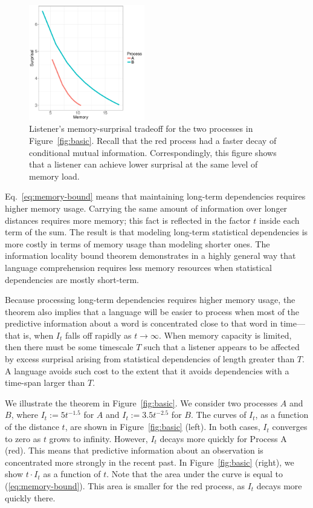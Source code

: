 \begin{figure}
\includegraphics[width=0.45\textwidth]{figures/listener-tradeoff.pdf}
	\caption{Listener's memory-surprisal tradeoff for the two processes in Figure~\ref{fig:basic}. Recall that the red process had a faster decay of conditional mutual information. Correspondingly, this figure shows that a listener can achieve lower surprisal at the same level of memory load.}\label{fig:listener-tradeoff}
\end{figure}

Eq.~\ref{eq:memory-bound} means that maintaining long-term dependencies requires higher memory usage. Carrying the same amount of information over longer distances requires more memory; this fact is reflected in the factor $t$ inside each term of the sum. 
The result is that modeling long-term statistical dependencies is more costly in terms of memory usage than modeling shorter ones.
The information locality bound theorem demonstrates in a highly general way that language comprehension requires less memory resources when statistical dependencies are mostly short-term. 

Because processing long-term dependencies requires higher memory usage, the theorem also implies that a language will be easier to process when most of the predictive information about a word is concentrated close to that word in time---that is, when $I_t$ falls off rapidly as $t \rightarrow \infty$. When memory capacity is limited, then there must be some timescale $T$ such that a listener appears to be affected by excess surprisal arising from statistical dependencies of length greater than $T$. A language avoids such cost to the extent that it avoids dependencies with a time-span larger than $T$.

We illustrate the theorem in Figure~\ref{fig:basic}.
We consider two processes $A$ and $B$, where $I_t := 5t^{-1.5}$ for $A$ and $I_t := 3.5 t^{-2.5}$ for $B$.
The curves of $I_t$, as a function of the distance $t$, are shown in Figure~\ref{fig:basic} (left).
In both cases, $I_t$ converges to zero as $t$ grows to infinity. 
However, $I_t$ decays more quickly for Process A (red).
This means that predictive information about an observation is concentrated more strongly in the recent past.
In Figure~\ref{fig:basic} (right), we show $t\cdot I_t$ as a function of $t$.
Note that the area under the curve is equal to (\ref{eq:memory-bound}).
This area is smaller for the red process, as $I_t$ decays more quickly there.  




